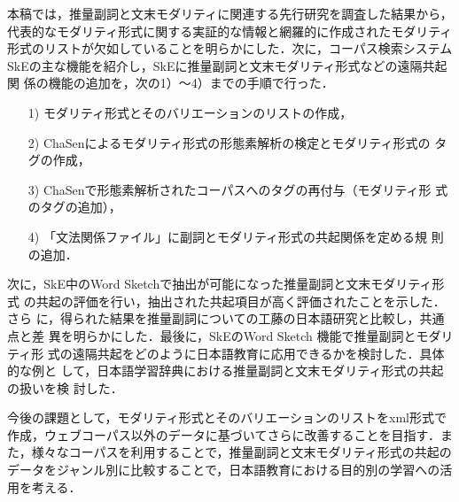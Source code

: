 \documentclass[japanese]{jnlp_1.4}
\begin{document}
本稿では，推量副詞と文末モダリティに関連する先行研究を調査した結果から，
代表的なモダリティ形式に関する実証的な情報と網羅的に作成されたモダリティ
形式のリストが欠如していることを明らかにした．次に，コーパス検索システム
SkEの主な機能を紹介し，SkEに推量副詞と文末モダリティ形式などの遠隔共起関
係の機能の追加を，次の1）〜4）までの手順で行った．
\begin{itemize}
\item[1)] モダリティ形式とそのバリエーションのリストの作成，
\item[2)] ChaSenによるモダリティ形式の形態素解析の検定とモダリティ形式の
 タグの作成，
\item[3)] ChaSenで形態素解析されたコーパスへのタグの再付与（モダリティ形
 式のタグの追加），
\item[4)] 「文法関係ファイル」に副詞とモダリティ形式の共起関係を定める規
 則の追加．
\end{itemize}

次に，SkE中のWord Sketchで抽出が可能になった推量副詞と文末モダリティ形式
の共起の評価を行い，抽出された共起項目が高く評価されたことを示した．さら
に，得られた結果を推量副詞についての工藤の日本語研究と比較し，共通点と差
異を明らかにした．最後に，SkEのWord Sketch 機能で推量副詞とモダリティ形
式の遠隔共起をどのように日本語教育に応用できるかを検討した．具体的な例と
して，日本語学習辞典における推量副詞と文末モダリティ形式の共起の扱いを検
討した．

今後の課題として，モダリティ形式とそのバリエーションのリストをxml形式で
作成，ウェブコーパス以外のデータに基づいてさらに改善することを目指す．ま
た，様々なコーパスを利用することで，推量副詞と文末モダリティ形式の共起の
データをジャンル別に比較することで，日本語教育における目的別の学習への活
用を考える．
\end{document}

